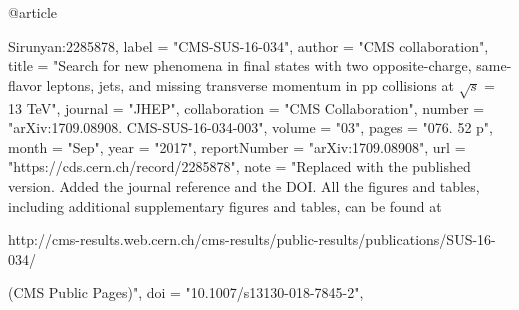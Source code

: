 @article{Sirunyan:2285878,
      label          = "CMS-SUS-16-034",
      author        = "{CMS collaboration}",
      title         = "{Search for new phenomena in final states with two
                       opposite-charge, same-flavor leptons, jets, and missing
                       transverse momentum in pp collisions at $\sqrt{s} = $ 13
                       TeV}",
      journal       = "JHEP",
      collaboration = "CMS Collaboration",
      number        = "arXiv:1709.08908. CMS-SUS-16-034-003",
      volume        = "03",
      pages         = "076. 52 p",
      month         = "Sep",
      year          = "2017",
      reportNumber  = "arXiv:1709.08908",
      url           = "https://cds.cern.ch/record/2285878",
      note          = "Replaced with the published version. Added the journal
                       reference and
  the DOI. All the figures and tables,
                       including additional supplementary
  figures and tables,
                       can be found at
 
                       http://cms-results.web.cern.ch/cms-results/public-results/publications/SUS-16-034/

                        (CMS Public Pages)",
      doi           = "10.1007/s13130-018-7845-2",
}

